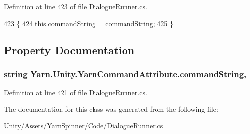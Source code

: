 Definition at line 423 of file Dialogue\-Runner.\-cs.


\begin{DoxyCode}
423                                                           \{
424             this.commandString = \hyperlink{a00193_a6d513a725c819ffcdaa9c5788472ec8d}{commandString};
425         \}
\end{DoxyCode}


\subsection{Property Documentation}
\hypertarget{a00193_a6d513a725c819ffcdaa9c5788472ec8d}{
\subsubsection[{command\-String}]{\setlength{\rightskip}{0pt plus 5cm}string Yarn.\-Unity.\-Yarn\-Command\-Attribute.\-command\-String\hspace{0.3cm}{\ttfamily [get]}, {\ttfamily [set]}}}\label{a00193_a6d513a725c819ffcdaa9c5788472ec8d}


Definition at line 421 of file Dialogue\-Runner.\-cs.



The documentation for this class was generated from the following file\-:\begin{DoxyCompactItemize}
\item 
Unity/\-Assets/\-Yarn\-Spinner/\-Code/\hyperlink{a00292}{Dialogue\-Runner.\-cs}\end{DoxyCompactItemize}
